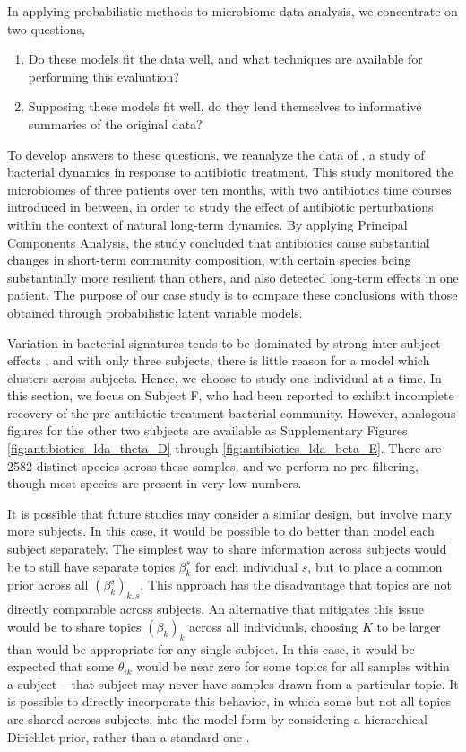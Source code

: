 \documentclass{article}
\begin{document}
In applying probabilistic methods to microbiome data analysis, we concentrate on
two questions,
\begin{enumerate}
\item Do these models fit the data well, and what techniques are available for
  performing this evaluation?
\item Supposing these models fit well, do they lend themselves to informative
  summaries of the original data?
\end{enumerate}

To develop answers to these questions, we reanalyze the data of
\cite{dethlefsen2011incomplete}, a study of bacterial dynamics in response to
antibiotic treatment. This study monitored the microbiomes of three patients
over ten months, with two antibiotics time courses introduced in between, in
order to study the effect of antibiotic perturbations within the context of
natural long-term dynamics. By applying Principal Components Analysis, the study
concluded that antibiotics cause substantial changes in short-term community
composition, with certain species being substantially more resilient than
others, and also detected long-term effects in one patient. The purpose of our
case study is to compare these conclusions with those obtained through
probabilistic latent variable models.

Variation in bacterial signatures tends to be dominated by strong inter-subject
effects \citep{eckburg2005diversity}, and with only three subjects, there is
little reason for a model which clusters across subjects. Hence, we choose to
study one individual at a time. In this section, we focus on Subject F, who had
been reported to exhibit incomplete recovery of the pre-antibiotic treatment
bacterial community. However, analogous figures for the other two subjects are
available as Supplementary Figures \ref{fig:antibiotics_lda_theta_D} through
\ref{fig:antibiotics_lda_beta_E}. There are 2582 distinct species across these
samples, and we perform no pre-filtering, though most species are present in
very low numbers.

It is possible that future studies may consider a similar design, but involve
many more subjects. In this case, it would be possible to do better than model
each subject separately. The simplest way to share information across subjects
would be to still have separate topics $\beta_{k}^{s}$ for each individual $s$,
but to place a common prior across all $\left(\beta_{k}^{s}\right)_{k, s}$. This
approach has the disadvantage that topics are not directly comparable across
subjects. An alternative that mitigates this issue would be to share topics
$\left(\beta_{k}\right)_{k}$ across all individuals, choosing $K$ to be larger
than would be appropriate for any single subject. In this case, it would be
expected that some $\theta_{ik}$ would be near zero for some topics for all
samples within a subject -- that subject may never have samples drawn from a
particular topic. It is possible to directly incorporate this behavior, in which
some but not all topics are shared across subjects, into the model form by
considering a hierarchical Dirichlet prior, rather than a standard one
\citep{wallach2006topic, teh2005sharing}.
\end{document}

